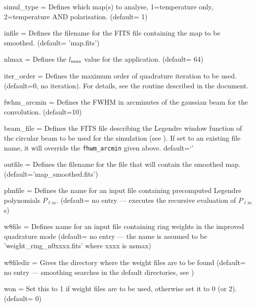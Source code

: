 \begin{qualifiers}
  \begin{qulist}{} %
     \item[{simul\_type = }]%
 Defines which map(s) to analyse, 1=temperature only, 2=temperature AND polarisation.
(default= 1)
    \item[{infile = }]%
 Defines the filename for the FITS file containing the map to be smoothed. 
	(default= 'map.fits')
    \item[{nlmax = }]%
 Defines the $l_{\mathrm{max}}$ value for the application.
(default= 64)
    \item[{iter\_order = }]%
 Defines the maximum order of quadrature 
      iteration to be used. (default=0, no iteration).
For details, see the  routine
described in the  document.
 \item[{fwhm\_arcmin = }]%
 Defines the FWHM in arcminutes of the gaussian 
beam for the convolution. (default=10)
    \item[{beam\_file = }] Defines the FITS file describing the
    Legendre window
    function of the circular beam to be used for the
    simulation (see ). 
    If set to an existing file name, it will override the
    {\tt fhwm\_arcmin} given above. default=`'
\item[{outfile = }]%
 Defines the filename for the file that will contain 
the smoothed map. (default='map\_smoothed.fits')
     \item[{plmfile = }] Defines the name for an input file
    containing  precomputed Legendre polynomials $P_{\ell m}$.
(default= no entry --- \thedocid executes the recursive evaluation 
of $P_{\ell m}$s)
\item[{w8file = }]%
 Defines name for an input file containing ring
  weights in the improved quadrature mode (default= no entry ---
the name is assumed to be 'weight\_ring\_n0xxxx.fits' where xxxx is nsmax)
\item[{w8filedir = }]%
 Gives the directory where the weight files are
to be found (default= no entry --- smoothing searches in the default
directories, see )
\item[{won = }]%
 Set this to 1 if weight files are to be used,
otherwise set it to 0 (or 2). (default= 0)
  \end{qulist}
\end{qualifiers}

